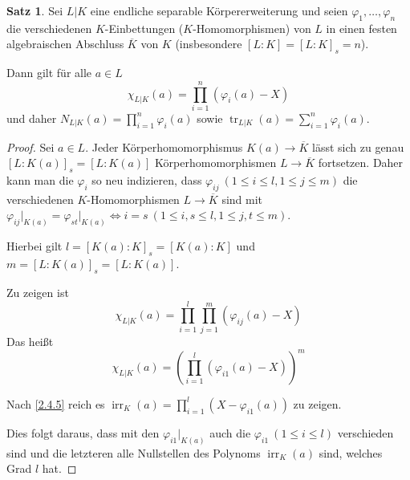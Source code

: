 \documentclass[
twoside=semi,
fontsize=12,
DIV=12, 
cleardoublepage=current,
leqno,
headings=optiontoheadandtoc, 
toc=idx
]{scrbook}
\newcommand{\brac}[1]{\left( #1 \right)}
\DeclareMathOperator{\irr}{irr}
\DeclareMathOperator{\tr}{tr}
\theoremstyle{definition}
\newtheorem{satz}[definition]{Satz}
\begin{document}
	\begin{satz}\label{2.4.6}
		Sei $L|K$ eine endliche separable K\"orpererweiterung und seien $\varphi_1, \dots, \varphi_n$ die verschiedenen $K$-Einbettungen ($K$-Homomorphismen) von $L$ in einen festen algebraischen Abschluss $\overline{K}$ von $K$ (insbesondere $[L:K] = [L:K]_s = n$).
		
		Dann gilt f\"ur alle $a \in L$
			\[\chi_{L|K}(a) = \prod_{i=1}^n (\varphi_i(a) -X)\]
		und daher $N_{L|K}(a) = \prod_{i=1}^n \varphi_i(a)$ sowie $\tr_{L|K}(a) = \sum_{i=1}^{n}\varphi_i(a)$.
		
		\begin{proof}
			Sei $a \in L$. Jeder K\"orperhomomorphismus $K(a) \to \overline{K}$ l\"asst sich zu genau $[L:K(a)]_s = [L:K(a)]$ K\"orperhomomorphismen $L \to \overline{K}$ fortsetzen.
			Daher kann man die $\varphi_i$ so neu indizieren, dass $\varphi_{ij}\ (1 \leq i \leq l, 1 \leq j \leq m)$ die verschiedenen $K$-Homomorphismen $L \to \overline{K}$ sind mit $\varphi_{ij}\big|_{K(a)} = \varphi_{st}\big|_{K(a)} \Leftrightarrow i = s\ (1 \leq i,s\leq l, 1 \leq j, t \leq m)$.
			
			Hierbei gilt $l = [K(a):K]_s = [K(a):K]$ und 
			$m = [L:K(a)]_s = [L:K(a)]$.
			
			Zu zeigen ist 
				\[\chi_{L|K}(a) = \prod_{i=1}^{l}\prod_{j=1}^m(\varphi_{ij}(a)-X)\]
			Das hei\ss t
				\[\chi_{L|K}(a) = \brac{\prod_{i=1}^{l}(\varphi_{i1}(a)-X)}^m\]
				
			Nach \ref{2.4.5} reich es $\irr_K(a) = \prod_{i=1}^l (X-\varphi_{i1}(a))$ zu zeigen.
			
			Dies folgt daraus, dass mit den $\varphi_{i1}\big|_{K(a)}$ auch die $\varphi_{i1}\ (1\leq i \leq l)$ verschieden sind und die letzteren alle Nullstellen des Polynoms $\irr_K(a)$ sind, welches Grad $l$ hat.
		\end{proof}
	\end{satz}
	
\end{document}
